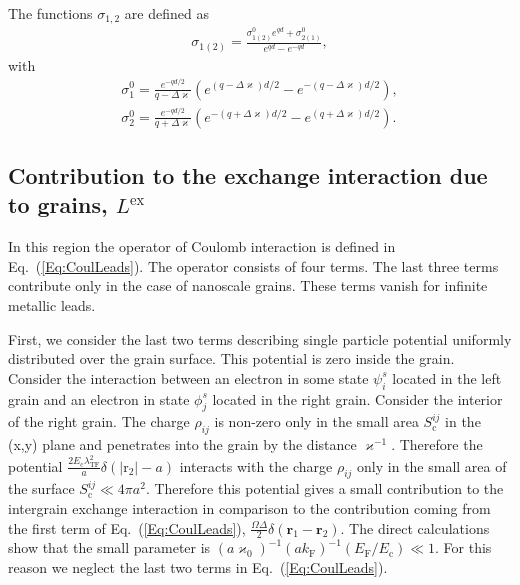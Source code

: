 \documentclass[aps,prb,amsmath,amssymb,twocolumn,superscriptaddress,showpacs,floatfix]{revtex4-1}
\begin{document}
The functions $\sigma_{1,2}$ are defined as
\begin{equation}\label{Eq:SurfCharges}
\begin{split}
\sigma_{1(2)}=\frac{\sigma_{1(2)}^0e^{qd}+\sigma_{2(1)}^0}{e^{qd}-e^{-qd}},
\end{split}
\end{equation}
with
\begin{equation}\label{Eq:SurfCharges2}
\begin{split}
\sigma_1^0=\frac{e^{-qd/2}}{q-\Delta \varkappa}\left(e^{(q-\Delta\varkappa)d/2}-e^{-(q-\Delta\varkappa)d/2}\right),\\
\sigma_2^0=\frac{e^{-qd/2}}{q+\Delta \varkappa}\left(e^{-(q+\Delta\varkappa)d/2}-e^{(q+\Delta\varkappa)d/2}\right).
\end{split}
\end{equation}



\subsection{Contribution to the exchange interaction due to grains, $L^\mathrm{ex}$}


In this region the operator of Coulomb interaction
is defined in Eq.~(\ref{Eq:CoulLeads}). The operator consists of four terms.
The last three terms contribute only in the case of nanoscale grains. These terms vanish
for infinite metallic leads.

First, we consider the last two terms describing
single particle potential uniformly distributed over the grain surface.
This potential is zero inside the grain. Consider the interaction between
an electron in some state $\psi_i^s$ located in the left grain and an electron in state $\phi^s_j$ located in the right grain.
 Consider the interior of the right grain.
The charge $\rho_{ij}$ is non-zero only in the small area $S^{ij}_\mathrm c$ in the (x,y) plane
and penetrates into the grain by the distance $\varkappa^{-1}$. Therefore the potential $\frac{2E_\mathrm c\lambda_\mathrm{TF}^2}{a}\delta(|\mathrm r_2|-a)$ interacts with the charge $\rho_{ij}$ only
in the small area of the surface $S^{ij}_\mathrm c \ll 4\pi a^2$.
Therefore this potential gives a small contribution to the intergrain
exchange interaction in comparison to the contribution coming from the first term of Eq.~(\ref{Eq:CoulLeads}), $\frac{\Omega\Delta}{2}\delta(\mathbf r_1-\mathbf r_2)$. The direct calculations show that the small parameter is
$(a\varkappa_0)^{-1}(ak_\mathrm F)^{-1}(E_\mathrm F/E_\mathrm c) \ll 1$. For this reason we neglect the last two
terms in Eq.~(\ref{Eq:CoulLeads}).
\end{document}
